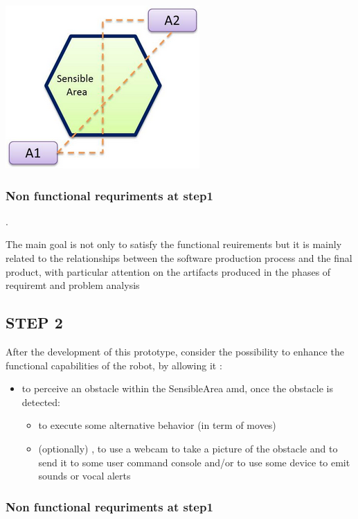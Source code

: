 \documentclass[11pt]{article}
\newcommand{\redize}[1]{{\color{violet}#1}}
\begin{document}
\includegraphics[scale=0.6]{img/reqImg.png}

\subsubsection{Non functional requriments at step1}.

The main goal is not only to satisfy the functional 
reuirements but it is mainly related to the relationships 
between the software production process and the final product, 
with particular attention on the artifacts produced in the phases 
of requiremt and problem analysis

\subsection{STEP 2}

 \redize{After} the development of this prototype, consider the possibility 
to enhance the functional capabilities of the robot, by allowing it :
\begin{itemize}
\item to perceive an obstacle within the  \redize{SensibleArea} amd, once the
obstacle is detected:
\begin{itemize}
  \item to execute some alternative behavior (in term of moves)
  \item (optionally) , to use a webcam to take a picture of the obstacle and to
  send it to some user command console and/or to use some device 
  to emit sounds or vocal alerts
\end{itemize}
\end{itemize}

\subsubsection{Non functional requriments at step1}
\end{document}
